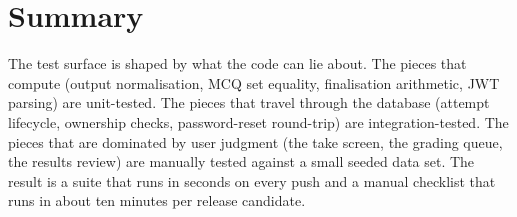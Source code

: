 \section{Summary}

The test surface is shaped by what the code can lie about. The pieces that compute (output normalisation, MCQ set equality, finalisation arithmetic, JWT parsing) are unit-tested. The pieces that travel through the database (attempt lifecycle, ownership checks, password-reset round-trip) are integration-tested. The pieces that are dominated by user judgment (the take screen, the grading queue, the results review) are manually tested against a small seeded data set. The result is a suite that runs in seconds on every push and a manual checklist that runs in about ten minutes per release candidate.
